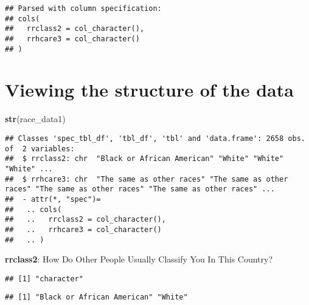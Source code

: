 \documentclass[]{article}
\newenvironment{Shaded}{\begin{snugshade}}{\end{snugshade}}
\newcommand{\KeywordTok}[1]{\textcolor[rgb]{0.13,0.29,0.53}{\textbf{#1}}}
\newcommand{\NormalTok}[1]{#1}
\newcommand{\OperatorTok}[1]{\textcolor[rgb]{0.81,0.36,0.00}{\textbf{#1}}}
\begin{document}
\begin{verbatim}
## Parsed with column specification:
## cols(
##   rrclass2 = col_character(),
##   rrhcare3 = col_character()
## )
\end{verbatim}

\hypertarget{viewing-the-structure-of-the-data}{%
\section{Viewing the structure of the
data}\label{viewing-the-structure-of-the-data}}

\begin{Shaded}
\begin{Highlighting}[]
\KeywordTok{str}\NormalTok{(race_data1)}
\end{Highlighting}
\end{Shaded}

\begin{verbatim}
## Classes 'spec_tbl_df', 'tbl_df', 'tbl' and 'data.frame': 2658 obs. of  2 variables:
##  $ rrclass2: chr  "Black or African American" "White" "White" "White" ...
##  $ rrhcare3: chr  "The same as other races" "The same as other races" "The same as other races" "The same as other races" ...
##  - attr(*, "spec")=
##   .. cols(
##   ..   rrclass2 = col_character(),
##   ..   rrhcare3 = col_character()
##   .. )
\end{verbatim}

\textbf{rrclass2}: How Do Other People Usually Classify You In This
Country?

\begin{Shaded}
\end{Shaded}

\begin{verbatim}
## [1] "character"
\end{verbatim}

\begin{Shaded}
\end{Shaded}

\begin{verbatim}
## [1] "Black or African American" "White"
\end{verbatim}
\end{document}
